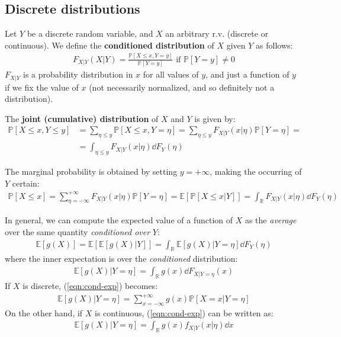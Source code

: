 \documentclass[../template.tex]{subfiles}
\begin{document}
\subsection{Discrete distributions}
Let $Y$ be a discrete random variable, and $X$ an arbitrary r.v. (discrete or continuous). We define the \textbf{conditioned distribution} of $X$ given $Y$ as  follows:
\begin{align}\label{eqn:cond-dist-discrete}
    F_{X|Y} (X|Y) = \frac{\mathbb{P}[X \leq x, Y=y]}{\mathbb{P}[Y=y]} \text{ if } \mathbb{P}[Y=y] \neq 0 
\end{align} 
$F_{X|Y}$ is a probability distribution in $x$ for all values of $y$, and just a function of $y$ if we fix the value of $x$ (not necessarily normalized, and so definitely not a distribution).

\medskip

The \textbf{joint (cumulative) distribution} of $X$ and $Y$ is given by:
\begin{align*}
    \mathbb{P}[X \leq x, Y \leq y] &= \sum_{\eta \leq y} \mathbb{P}[X \leq x, Y = \eta] = \sum_{\eta \leq y} F_{X|Y}(x|\eta) \mathbb{P}[Y=\eta] =\\
    &= \int_{\eta \leq y}F_{X|Y} (x|\eta) \dd{F_Y(\eta)}
\end{align*} 

The marginal probability is obtained by setting $y=+\infty$, making the occurring of $Y$ certain:
\begin{align*}
    \mathbb{P}[X \leq x] = \sum_{\eta = -\infty}^{+\infty} F_{X|Y} (x|\eta) \mathbb{P}[Y=\eta] = \mathbb{E}[\mathbb{P}[X \leq x|Y]] = \int_{\mathbb{R}} F_{X|Y} (x|\eta) \dd{F_Y(\eta)}
\end{align*}

In general, we can compute the expected value of a function of $X$ as the \textit{average} over the same quantity \textit{conditioned over} $Y$:
\begin{align*}
    \mathbb{E}[g(X)] = \mathbb{E}[\mathbb{E}[g(X)|Y]] = \int_{\mathbb{R}} \mathbb{E}[g(X)|Y=\eta] \dd{F_Y(\eta)}
\end{align*}  
where the inner expectation is over the \textit{conditioned} distribution: 
\begin{align}\label{eqn:cond-exp}
    \mathbb{E}[g(X)|Y=\eta] = \int_{\mathbb{R}} g(x) \dd{F_{X|Y=\eta}}(x)
\end{align}
If $X$ is discrete, (\ref{eqn:cond-exp}) becomes:
\begin{align*}
    \mathbb{E}[g(X)|Y=\eta] = \sum_{x=-\infty}^{+\infty} g(x) \mathbb{P}[X=x|Y=\eta]
\end{align*}
On the other hand, if $X$ is continuous, (\ref{eqn:cond-exp}) can be written as:
\begin{align*}
    \mathbb{E}[g(X)|Y=\eta] = \int_{\mathbb{R}} g(x) f_{X|Y}(x|\eta) \dd{x}
\end{align*}
\end{document}
